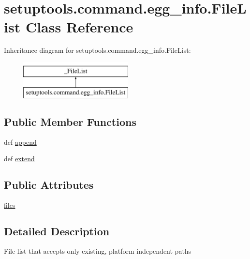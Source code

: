 \hypertarget{classsetuptools_1_1command_1_1egg__info_1_1FileList}{}\section{setuptools.\+command.\+egg\+\_\+info.\+File\+List Class Reference}
\label{classsetuptools_1_1command_1_1egg__info_1_1FileList}
Inheritance diagram for setuptools.\+command.\+egg\+\_\+info.\+File\+List\+:\begin{figure}[H]
\begin{center}
\leavevmode
\includegraphics[height=2.000000cm]{classsetuptools_1_1command_1_1egg__info_1_1FileList}
\end{center}
\end{figure}
\subsection*{Public Member Functions}
\begin{DoxyCompactItemize}
\item 
def \hyperlink{classsetuptools_1_1command_1_1egg__info_1_1FileList_aac1a2cd05a8761b2644a6b8ae7500611}{append}
\item 
def \hyperlink{classsetuptools_1_1command_1_1egg__info_1_1FileList_ada09833ae8455761d57762197bb92a87}{extend}
\end{DoxyCompactItemize}
\subsection*{Public Attributes}
\begin{DoxyCompactItemize}
\item 
\hyperlink{classsetuptools_1_1command_1_1egg__info_1_1FileList_a5f5f8c4a6db4580cf53125d54a15d75a}{files}
\end{DoxyCompactItemize}


\subsection{Detailed Description}
\begin{DoxyVerb}File list that accepts only existing, platform-independent paths\end{DoxyVerb}
 

